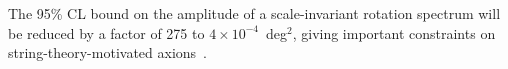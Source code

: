 \documentclass[PICOAPC.tex]{subfiles}
\begin{document}
The 95\% CL bound on the amplitude of a scale-invariant rotation spectrum will be reduced by a factor of 275 to $4\times10^{-4}$~deg$^2$, giving important constraints on string-theory-motivated axions~\cite{Svrcek:2006yi,Pospelov:2008gg}.


\end{document}
